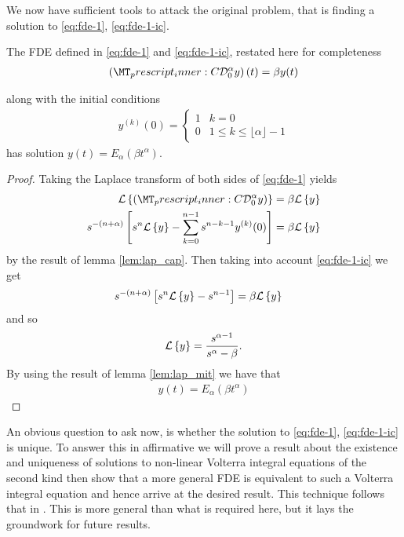 \documentclass{article}
\begin{document}
We now have sufficient tools to attack the original problem, that is finding a solution to \eqref{eq:fde-1}, \eqref{eq:fde-1-ic}.

\begin{lemma}
	The FDE defined in \eqref{eq:fde-1} and \eqref{eq:fde-1-ic}, restated here for completeness 
	\begin{align*}
		\left( \prescript{C}{}{\mathcal{D}_0^\alpha}y \right)(t) = \beta y(t) 
	\end{align*}

	along with the initial conditions 
	\begin{align*}
		y^{(k)}(0) = 
		\begin{cases}
			1 & k = 0 \\
			0 & 1 \leq k \leq \lfloor \alpha \rfloor - 1  
		\end{cases}
	\end{align*}
	has solution $ y(t) = E_\alpha \left( \beta t^\alpha \right) $.
\end{lemma}
\begin{proof}
	Taking the Laplace transform of both sides of \eqref{eq:fde-1} yields
	\begin{align*}
		\laplace{\capder{0}{\alpha}{y}} &= \beta \laplace{y} \\
		s^{-(n+\alpha)} \left[s^n \laplace{y} - \sum_{k=0}^{n-1} s^{n-k-1} y^{(k)}(0) \right] &= \beta \laplace{y}
	\end{align*}
	by the result of lemma \ref{lem:lap_cap}. 
	Then taking into account \eqref{eq:fde-1-ic} we get
	\begin{align*}
		s^{-(n+\alpha)} \left[s^n \mathcal{L} \left\{ y \right\} - s^{n-1}\right] &= \beta \mathcal{L} \left\{ y \right\}
	\end{align*}
	and so 
	\begin{align*}
		\mathcal{L} \left\{ y \right\} = \frac{s^{\alpha-1}}{s^\alpha - \beta}.
	\end{align*}
	By using the result of lemma \ref{lem:lap_mit} we have that 
	\begin{align*}
		y(t) = E_\alpha(\beta t^\alpha)
	\end{align*}
\end{proof}

An obvious question to ask now, is whether the solution to \eqref{eq:fde-1}, \eqref{eq:fde-1-ic} is unique. To answer this in 
affirmative we will prove a result about the existence and uniqueness of solutions to non-linear Volterra integral equations of the second kind
then show that a more general FDE is equivalent to such a Volterra integral equation and hence arrive at the desired result. 
This technique follows that in \cite{Diethelm2002}. This 
is more general than what is required here, but it lays the groundwork for future results.
\end{document}
